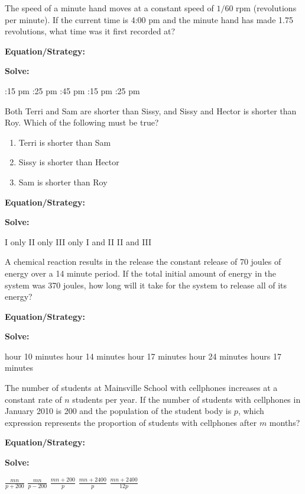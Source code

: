 \vfill
\newpage
\begin{multicols*}{2}
\begin{outline}[enumerate]
\medium

\1 The speed of a minute hand moves at a constant speed of $1/60$ rpm (revolutions per minute). If the current time is 4:00 pm and the minute hand has made 1.75 revolutions, what time was it first recorded at?

\bigskip
\textbf{Equation/Strategy:} \hrulefill

\bigskip
\textbf{Solve:}

\vfill
{}:15 pm
:25 pm
:45 pm
:15 pm
:25 pm

\midline

\1 Both Terri and Sam are shorter than Sissy, and Sissy and Hector is shorter than Roy. Which of the following must be true?

\begin{enumerate}[label=\Roman*.]
\item Terri is shorter than Sam
\item Sissy is shorter than Hector
\item Sam is shorter than Roy
\end{enumerate}

\bigskip
\textbf{Equation/Strategy:} \hrulefill

\bigskip
\textbf{Solve:}

\vfill
\2 I only
\2 II only
\2 III only
\2 I and II
\2 II and III

\columnbreak
\advanced

\1 A chemical reaction results in the release the constant release of 70 joules of energy over a 14 minute period. If the total initial amount of energy in the system was 370 joules, how long will it take for the system to release all of its energy?

\bigskip
\textbf{Equation/Strategy:} \hrulefill

\bigskip
\textbf{Solve:}

\vfill
{} hour 10 minutes
 hour 14 minutes
 hour 17 minutes
 hour 24 minutes
 hours 17 minutes

\vfill\vfill\phantom{}
\newpage
\1 The number of students at Mainsville School with cellphones increases at a constant rate of $n$ students per year. If the number of students with cellphones in January 2010 is 200 and the population of the student body is $p$, which expression represents the proportion of students with cellphones after $m$ months?

\bigskip
\textbf{Equation/Strategy:} \hrulefill

\textbf{Solve:}

\vfill
\2 $\frac{mn}{p+200}$
\2 $\frac{mn}{p-200}$
\2 $\frac{mn+200}{p}$
\2 $\frac{mn+2400}{p}$
\2 $\frac{mn+2400}{12p}$
\vfill\vfill\phantom{}
\end{outline}
\end{multicols*}
